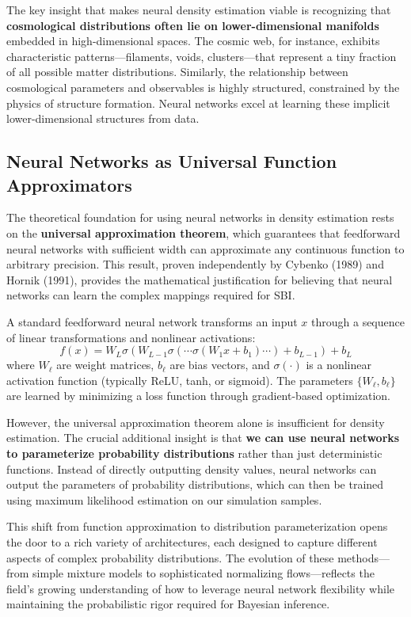 \documentclass{SciPost}
\begin{document}
The key insight that makes neural density estimation viable is recognizing that \textbf{cosmological distributions often lie on lower-dimensional manifolds} embedded in high-dimensional spaces. The cosmic web, for instance, exhibits characteristic patterns—filaments, voids, clusters—that represent a tiny fraction of all possible matter distributions. Similarly, the relationship between cosmological parameters and observables is highly structured, constrained by the physics of structure formation. Neural networks excel at learning these implicit lower-dimensional structures from data.

\subsection{Neural Networks as Universal Function Approximators}

The theoretical foundation for using neural networks in density estimation rests on the \textbf{universal approximation theorem}, which guarantees that feedforward neural networks with sufficient width can approximate any continuous function to arbitrary precision. This result, proven independently by Cybenko (1989) and Hornik (1991), provides the mathematical justification for believing that neural networks can learn the complex mappings required for SBI.

A standard feedforward neural network transforms an input $x$ through a sequence of linear transformations and nonlinear activations:
\begin{equation}
    f(x) = W_L \sigma(W_{L-1} \sigma(\cdots \sigma(W_1 x + b_1) \cdots) + b_{L-1}) + b_L
\end{equation}
where $W_\ell$ are weight matrices, $b_\ell$ are bias vectors, and $\sigma(\cdot)$ is a nonlinear activation function (typically ReLU, tanh, or sigmoid). The parameters $\{W_\ell, b_\ell\}$ are learned by minimizing a loss function through gradient-based optimization.

However, the universal approximation theorem alone is insufficient for density estimation. The crucial additional insight is that \textbf{we can use neural networks to parameterize probability distributions} rather than just deterministic functions. Instead of directly outputting density values, neural networks can output the parameters of probability distributions, which can then be trained using maximum likelihood estimation on our simulation samples.

This shift from function approximation to distribution parameterization opens the door to a rich variety of architectures, each designed to capture different aspects of complex probability distributions. The evolution of these methods—from simple mixture models to sophisticated normalizing flows—reflects the field's growing understanding of how to leverage neural network flexibility while maintaining the probabilistic rigor required for Bayesian inference.
\end{document}

